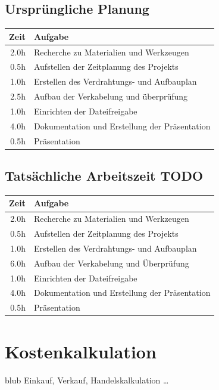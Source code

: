 \documentclass[
a4paper,     %
 headsepline, %
11pt         %
]{scrartcl}  %
\begin{document}
\subsection{Ursprüngliche Planung}
\begin{tabular}{ r | l }
	\hline 
	Zeit &	Aufgabe \\ \hline
	2.0h &	Recherche zu Materialien und Werkzeugen \\
	0.5h &	Aufstellen der Zeitplanung des Projekts \\
	1.0h &	Erstellen des Verdrahtungs- und Aufbauplan \\
	2.5h &	Aufbau der Verkabelung und überprüfung \\
	1.0h &	Einrichten der Dateifreigabe \\
	4.0h &	Dokumentation und Erstellung der Präsentation \\
	0.5h & 	Präsentation \\
	\hline
\end{tabular}


\subsection{Tatsächliche Arbeitszeit TODO}
\begin{tabular}{ r | l }
	\hline 
	Zeit &	Aufgabe \\ \hline
	2.0h &	Recherche zu Materialien und Werkzeugen \\
	0.5h &	Aufstellen der Zeitplanung des Projekts \\
	1.0h &	Erstellen des Verdrahtungs- und Aufbauplan \\
	6.0h &	Aufbau der Verkabelung und Überprüfung \\
	1.0h &	Einrichten der Dateifreigabe \\
	4.0h &	Dokumentation und Erstellung der Präsentation \\
	0.5h & 	Präsentation \\
	\hline
\end{tabular}

\section{Kostenkalkulation}
blub Einkauf, Verkauf, Handelskalkulation …
\end{document}

